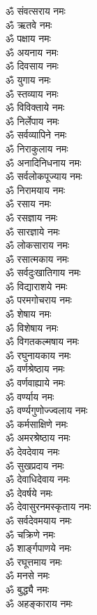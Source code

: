 \begin{multicols}{2}
\begin{flushleft}
ॐ संवत्सराय नमः\\
ॐ ऋतवे नमः\\
ॐ पक्षाय नमः\\
ॐ अयनाय नमः\\
ॐ दिवसाय नमः\\
ॐ युगाय नमः\\
ॐ स्तव्याय नमः\\
ॐ विविक्ताये नमः\\
ॐ निर्लेपाय नमः\hfill{}\\
ॐ सर्वव्यापिने नमः\\
ॐ निराकुलाय नमः\\
ॐ अनादिनिधनाय नमः\\
ॐ सर्वलोकपूज्याय नमः\\
ॐ निरामयाय नमः\\
ॐ रसाय नमः\\
ॐ रसज्ञाय नमः\\
ॐ सारज्ञाये नमः\\
ॐ लोकसाराय नमः\\
ॐ रसात्मकाय नमः\hfill{}\\
ॐ सर्वदुःखातिगाय नमः\\
ॐ विद्याराशये नमः\\
ॐ परमगोचराय नमः\\
ॐ शेषाय नमः\\
ॐ विशेषाय नमः\\
ॐ विगतकल्मषाय नमः\\
ॐ रघुनायकाय नमः\\
ॐ वर्णश्रेष्ठाय नमः\\
ॐ वर्णवाह्याये नमः\\
ॐ वर्ण्याय नमः\hfill{}\\
ॐ वर्ण्यगुणोज्ज्वलाय नमः\\
ॐ कर्मसाक्षिणे नमः\\
ॐ अमरश्रेष्ठाय नमः\\
ॐ देवदेवाय नमः\\
ॐ सुखप्रदाय नमः\\
ॐ देवाधिदेवाय नमः\\
ॐ देवर्षये नमः\\
ॐ देवासुरनमस्कृताय नमः\\
ॐ सर्वदेवमयाय नमः\\
ॐ चक्रिणे नमः\hfill{}\\
ॐ शार्ङ्गपाणये नमः\\
ॐ रघूत्तमाय नमः\\
ॐ मनसे नमः\\
ॐ बुद्ध्यै नमः\\
ॐ अहङ्काराय नमः\\

\end{flushleft}
\end{multicols}
